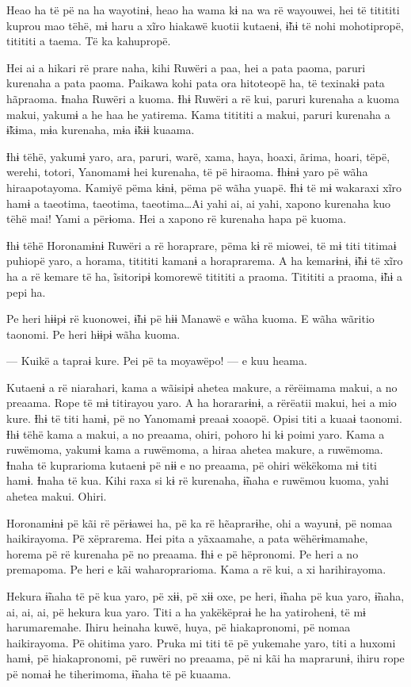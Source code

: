 Heao ha të pë na ha wayotinɨ, heao ha wama kɨ na wa rë wayouwei, hei të
titititi kuprou mao tëhë, mɨ haru a xĩro hiakawë kuotii kutaenɨ, ɨ̃hɨ të
nohi mohotipropë, titititi a taema. Të ka kahupropë. 

Hei ai a hikari rë prare naha, kihi Ruwëri a paa, hei a pata paoma,
paruri kurenaha a pata paoma. Paikawa kohi pata ora hitoteopë ha, të
texinakɨ pata hãpraoma. Ɨnaha Ruwëri a kuoma. Ɨhɨ Ruwëri a rë kui,
paruri kurenaha a kuoma makui, yakumɨ a he haa he yatirema. Kama
titititi a makui, paruri kurenaha a ɨ̃kɨma, mɨa kurenaha, mɨa ɨ̃kɨɨ
kuaama. 

Ɨhɨ tëhë, yakumɨ yaro, ara, paruri, warë, xama, haya, hoaxi, ãrima,
hoari, tëpë, werehi, totori, Yanomamɨ hei kurenaha, të pë hiraoma. Ɨhɨnɨ
yaro pë wãha hiraapotayoma. Kamiyë pëma kɨnɨ, pëma pë wãha yuapë. Ɨhɨ të
mɨ wakaraxi xĩro hamɨ a taeotima, taeotima, taeotima…Ai yahi ai,
ai yahi, xapono kurenaha kuo tëhë mai! Yami a përɨoma. Hei a xapono rë
kurenaha hapa pë kuoma. 

Ɨhɨ tëhë Horonamɨnɨ Ruwëri a rë horaprare, pëma kɨ rë miowei, të mɨ titi
titimaɨ puhiopë yaro, a horama, titititi kamanɨ a horaprarema. A ha
kemarɨnɨ, ɨ̃hɨ të xĩro ha a rë kemare të ha, ĩsitoripɨ komorewë titititi
a praoma. Titititi a praoma, ɨ̃hɨ a pepi ha. 

Pe heri hɨɨpɨ rë kuonowei, ɨ̃hɨ pë hɨɨ Manawë e wãha kuoma. E wãha
wãritio taonomi. Pe heri hɨɨpɨ wãha kuoma. 

--- Kuikë a tapraɨ kure. Pei pë ta moyawëpo! --- e kuu heama. 

Kutaenɨ a rë niarahari, kama a wãisipɨ ahetea makure, a rërëimama makui,
a no preaama. Rope të mɨ titirayou yaro. A ha horararɨnɨ, a rërëatii
makui, hei a mio kure. Ɨhɨ të titi hamɨ, pë no Yanomamɨ preaaɨ xoaopë.
Opisi titi a kuaaɨ taonomi. Ɨhɨ tëhë kama a makui, a no preaama, ohiri,
pohoro hi kɨ poimi yaro. Kama a ruwëmoma, yakumɨ kama a ruwëmoma, a
hiraa ahetea makure, a ruwëmoma. Ɨnaha të kuprarioma kutaenɨ pë nɨɨ e no
preaama, pë ohiri wëkëkoma mɨ titi hamɨ. Ɨnaha të kua. Kihi raxa si kɨ
rë kurenaha, ɨ̃naha e ruwëmou kuoma, yahi ahetea makui. Ohiri. 

Horonamɨnɨ pë kãi rë përɨawei ha, pë ka rë hẽaprarɨhe, ohi a wayunɨ, pë
nomaa haikirayoma. Pë xëprarema. Hei pita a yãxaamahe, a pata
wëhërɨmamahe, horema pë rë kurenaha pë no preaama. Ɨhɨ e pë hëpronomi.
Pe heri a no premapoma. Pe heri e kãi waharoprarioma. Kama a rë kui, a
xi harihirayoma. 

Hekura ɨ̃naha të pë kua yaro, pë xɨɨ, pë xɨɨ oxe, pe heri, ɨ̃naha pë kua
yaro, ɨ̃naha, ai, ai, ai, pë hekura kua yaro. Titi a ha yakëkëpraɨ he ha
yatirohenɨ, të mɨ harumaremahe. Ihiru heinaha kuwë, huya, pë
hiakapronomi, pë nomaa haikirayoma. Pë ohitima yaro. Pruka mi titi të pë
yukemahe yaro, titi a huxomi hamɨ, pë hiakapronomi, pë ruwëri no
preaama, pë ni kãi ha maprarunɨ, ihiru rope pë nomaɨ he tiherimoma,
ɨ̃naha të pë kuaama. 

